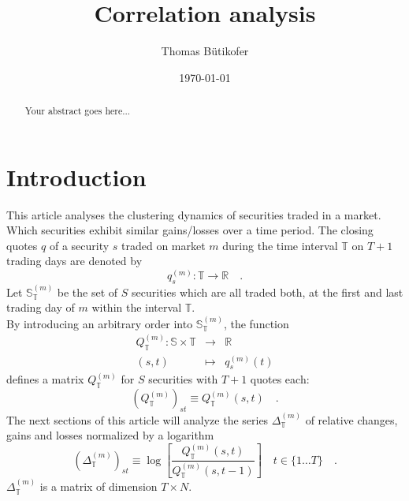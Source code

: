 \documentclass[11pt,twoside,a4paper]{article}
\begin{document}
\title{Correlation analysis}
\author{Thomas Bütikofer}
\date{\today}
\maketitle
\begin{abstract}
Your abstract goes here...
\end{abstract}
\section{Introduction}
This article analyses the clustering dynamics of securities traded in a market. Which securities exhibit similar gains/losses over a time period.
The closing quotes $q$ of a security $s$ traded on market $m$ during the time interval $\mathbb{T}$ on $T+1$ trading days are denoted by
\begin{equation}
q^{(m)}_{s}:\mathbb{T}\rightarrow\mathbb{R}\quad.
\label{eqDefQuoteSeries}
\end{equation}
Let $\mathbb{S}^{(m)}_\mathbb{T}$ be the set of $S$ securities which are all traded both, at the first and last trading day of $m$ within the interval $\mathbb{T}$.\\
By introducing an arbitrary order into $\mathbb{S}^{(m)}_\mathbb{T}$, the function
\begin{eqnarray}
Q^{(m)}_{\mathbb{T}}:\mathbb{S}\times\mathbb{T}&\rightarrow&\mathbb{R}\\
(s,t)&\mapsto&q^{(m)}_s(t)
\end{eqnarray}
defines a matrix $Q^{(m)}_{\mathbb{T}}$ for $S$ securities with $T+1$ quotes each:
\begin{equation}
(Q^{(m)}_{\mathbb{T}})_{st}\equiv Q^{(m)}_{\mathbb{T}}(s,t)\quad.
\end{equation}
The next sections of this article will analyze the series $\Delta^{(m)}_{\mathbb{T}}$ of relative changes, gains and losses normalized by a logarithm 
\begin{equation}
\left(\Delta^{(m)}_{\mathbb{T}}\right)_{st} \equiv \log\left[\frac{Q^{(m)}_{\mathbb{T}}(s,t)}{Q^{(m)}_{\mathbb{T}}(s,t-1)}\right]\quad t\in\{1\ldots T\}\quad.
\end{equation}
$\Delta^{(m)}_{\mathbb{T}}$ is a matrix of dimension $T\times N$.\\
\end{document}
